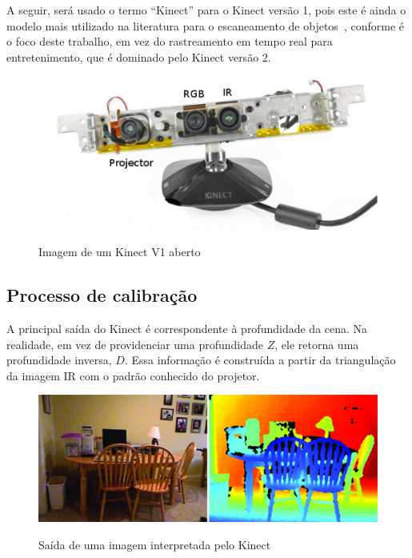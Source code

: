 A seguir, será usado o termo ``Kinect'' para o Kinect versão 1, pois este é ainda
o modelo mais utilizado na literatura para o escaneamento de objetos~\cite{doi:10.1177/0278364911434148}, conforme
é o foco deste trabalho, em vez do rastreamento em tempo real para entretenimento, que é
dominado pelo Kinect versão 2.

\newpage

\begin{figure}[!h]
	\centering
	\caption{
	Imagem de um Kinect V1 aberto
	}	
	\includegraphics[width=0.5\linewidth]{figs/kinect.png}
   \label{fig:kinectv1}
\end{figure}

\subsection{Processo de calibração}

A principal saída do Kinect é correspondente à profundidade da
cena. Na realidade, em vez de providenciar uma profundidade $Z$, ele retorna uma profundidade
inversa, $D$. Essa informação é construída a partir da triangulação
da imagem IR com o padrão conhecido do projetor.

\begin{figure}[!h]
	\centering
	\caption{Saída de uma imagem interpretada pelo Kinect}
	\includegraphics[width=1\linewidth]{figs/profundidadekinect.png}
   \label{fig:profKinect}
\end{figure}
 
